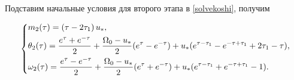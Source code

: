 \documentclass[a4paper,12pt, openany]{book}
\theoremstyle{plain} %
\theoremstyle{definition} %
\theoremstyle{remark} %
\numberwithin{equation}{chapter}
\begin{document}
{Подставим начальные условия для второго этапа в \eqref{solvekoshi}, получим

\[
    \left\{ {\begin{aligned}
                 & m_2(\tau) = \left(\tau -2 \tau _1\right) u_*, \hfill                                                                                                \\
                 & \theta_2(\tau) = \frac{e^\tau+e^{-\tau}}{2}+\frac{\Omega_0-u_\ast}{2}(e^\tau-e^{-\tau})+u_*(e^{\tau-\tau_1}-e^{-\tau+\tau_1}+2\tau_1-\tau) , \hfill \\
                 & \omega_2(\tau) = \frac{e^\tau-e^{-\tau}}{2}+\frac{\Omega_0-u_\ast}{2}(e^\tau+e^{-\tau})+u_*(e^{\tau-\tau_1}+e^{-\tau+\tau_1}-1) . \hfill            \\
            \end{aligned}} \right.
\]
}
\end{document}
